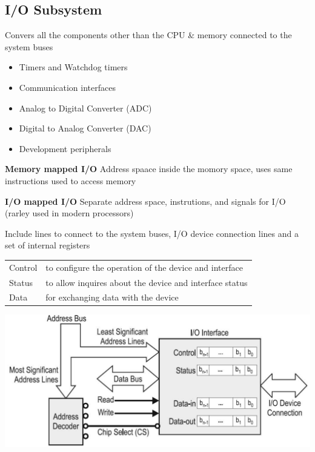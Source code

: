 \subsection{I/O Subsystem}
Convers all the components other than the CPU \& memory connected to the system buses
\begin{itemize}
    \item Timers and Watchdog timers
    \item Communication interfaces
    \item Analog to Digital Converter (ADC)
    \item Digital to Analog Converter (DAC)
    \item Development peripherals
\end{itemize}
\begin{multicols}{2}
    \begin{minipage}{\linewidth}
        \textbf{Memory mapped I/O}\newline
        Address spaace inside the momory space, uses same instructions used to access memory
    \end{minipage}
    
    \begin{minipage}{\linewidth}
        \textbf{I/O mapped I/O} \newline
        Separate address space, instrutions, and signals for I/O (rarley used in modern processors)
    \end{minipage}
\end{multicols}
\hspace{0.5cm}
\begin{multicols}{2}
    \begin{minipage}{\linewidth}
        Include lines to connect to the system buses, I/O device connection lines and a set of internal registers
        \begin{tabular}{ll}
            Control & to configure the operation of the device and interface  \\  
            Status & to allow inquires about the device and interface status  \\ 
            Data & for exchanging data with the device \\ 
        \end{tabular} 
    \end{minipage}
    \includegraphics[width=0.9\linewidth]{images/IOAnatomy}  
\end{multicols}
\clearpage

